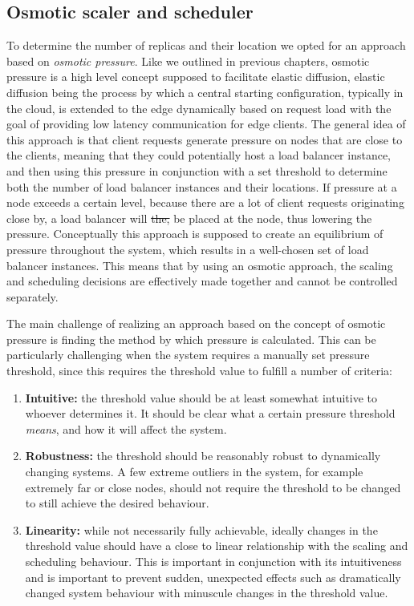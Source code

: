 \documentclass[draft,final]{vutinfth} %
\providecommand{\DIFdeltex}[1]{{\protect\color{red}\sout{#1}}}                      %
\providecommand{\DIFdelbegin}{} %
\providecommand{\DIFdelend}{} %
\providecommand{\DIFdel}[1]{\texorpdfstring{\DIFdeltex{#1}}{}} %
\begin{document}
\subsection{Osmotic scaler and scheduler}
To determine the number of replicas and their location we opted for an approach based on \textit{osmotic pressure}.
Like we outlined in previous chapters, osmotic pressure is a high level concept supposed to facilitate elastic diffusion, elastic diffusion being the process by which a central starting configuration, typically in the cloud, is extended to the edge dynamically based on request load with the goal of providing low latency communication for edge clients\cite{osmotic-middleware-rausch}. 
The general idea of this approach is that client requests generate pressure on nodes that are close to the clients, meaning that they could potentially host a load balancer instance, and then using this pressure in conjunction with a set threshold to determine both the number of load balancer instances and their locations.
If pressure at a node exceeds a certain level, because there are a lot of client requests originating close by, a load balancer will \DIFdelbegin \DIFdel{the, }\DIFdelend be placed at the node, thus lowering the pressure.
Conceptually this approach is supposed to create an equilibrium of pressure throughout the system, which results in a well-chosen set of load balancer instances.
This means that by using an osmotic approach, the scaling and scheduling decisions are effectively made together and cannot be controlled separately.

The main challenge of realizing an approach based on the concept of osmotic pressure is finding the method by which pressure is calculated. This can be particularly challenging when the system requires a manually set pressure threshold, since this requires the threshold value to fulfill a number of criteria:
\begin{enumerate}
    \item \textbf{Intuitive:} the threshold value should be at least somewhat intuitive to whoever determines it. It should be clear what a certain pressure threshold \textit{means}, and how it will affect the system.
    \item \textbf{Robustness:} the threshold should be reasonably robust to dynamically changing systems. A few extreme outliers in the system, for example extremely far or close nodes, should not require the threshold to be changed to still achieve the desired behaviour.
    \item \textbf{Linearity:} while not necessarily fully achievable, ideally changes in the threshold value should have a close to linear relationship with the scaling and scheduling behaviour. This is important in conjunction with its intuitiveness and is important to prevent sudden, unexpected effects such as dramatically changed system behaviour with minuscule changes in the threshold value.
\end{enumerate}
\end{document}
